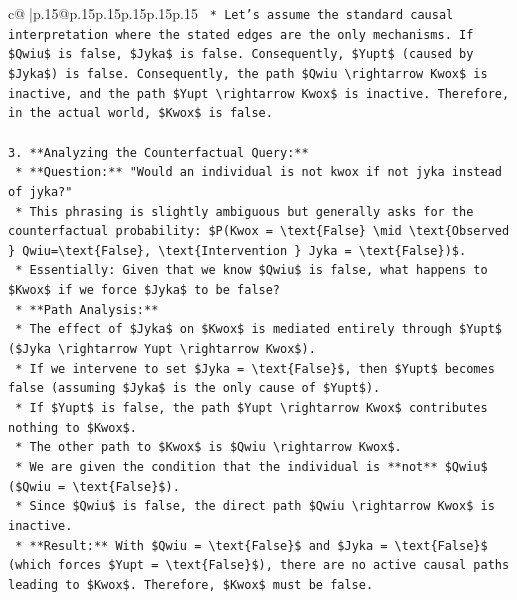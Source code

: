 \documentclass{article}
\begin{document}
{\begin{supertabular}{c@{$\;$}|p{.15\linewidth}@{}p{.15\linewidth}p{.15\linewidth}p{.15\linewidth}p{.15\linewidth}p{.15\linewidth}}
{{{\texttt{    *   Let's assume the standard causal interpretation where the stated edges are the only mechanisms. If \$Qwiu\$ is false, \$Jyka\$ is false. Consequently, \$Yupt\$ (caused by \$Jyka\$) is false. Consequently, the path \$Qwiu \textbackslash{}rightarrow Kwox\$ is inactive, and the path \$Yupt \textbackslash{}rightarrow Kwox\$ is inactive. Therefore, in the actual world, \$Kwox\$ is false.} \\
\\ 
\texttt{3.  **Analyzing the Counterfactual Query:**} \\
\texttt{    *   **Question:** "Would an individual is not kwox if not jyka instead of jyka?"} \\
\texttt{    *   This phrasing is slightly ambiguous but generally asks for the counterfactual probability: \$P(Kwox = \textbackslash{}text\{False\} \textbackslash{}mid \textbackslash{}text\{Observed \} Qwiu=\textbackslash{}text\{False\}, \textbackslash{}text\{Intervention \} Jyka = \textbackslash{}text\{False\})\$.} \\
\texttt{    *   Essentially: Given that we know \$Qwiu\$ is false, what happens to \$Kwox\$ if we force \$Jyka\$ to be false?} \\
\texttt{    *   **Path Analysis:**} \\
\texttt{        *   The effect of \$Jyka\$ on \$Kwox\$ is mediated entirely through \$Yupt\$ (\$Jyka \textbackslash{}rightarrow Yupt \textbackslash{}rightarrow Kwox\$).} \\
\texttt{        *   If we intervene to set \$Jyka = \textbackslash{}text\{False\}\$, then \$Yupt\$ becomes false (assuming \$Jyka\$ is the only cause of \$Yupt\$).} \\
\texttt{        *   If \$Yupt\$ is false, the path \$Yupt \textbackslash{}rightarrow Kwox\$ contributes nothing to \$Kwox\$.} \\
\texttt{        *   The other path to \$Kwox\$ is \$Qwiu \textbackslash{}rightarrow Kwox\$.} \\
\texttt{        *   We are given the condition that the individual is **not** \$Qwiu\$ (\$Qwiu = \textbackslash{}text\{False\}\$).} \\
\texttt{        *   Since \$Qwiu\$ is false, the direct path \$Qwiu \textbackslash{}rightarrow Kwox\$ is inactive.} \\
\texttt{    *   **Result:** With \$Qwiu = \textbackslash{}text\{False\}\$ and \$Jyka = \textbackslash{}text\{False\}\$ (which forces \$Yupt = \textbackslash{}text\{False\}\$), there are no active causal paths leading to \$Kwox\$. Therefore, \$Kwox\$ must be false.} \\
}}}
\end{supertabular}}
\end{document}
